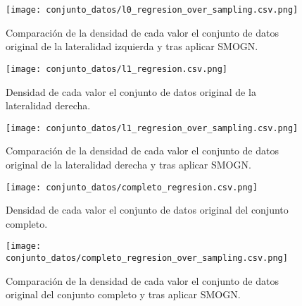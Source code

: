 \begin{figure}[H]
    \centering
     \texttt{[image: conjunto\_datos/l0\_regresion\_over\_sampling.csv.png]}
    \caption{Comparación de la densidad de cada valor el conjunto de datos original de la lateralidad izquierda y tras aplicar SMOGN.}
	 \label{fig:l0-over}
\end{figure}

\begin{figure}[H]
    \centering
	  \texttt{[image: conjunto\_datos/l1\_regresion.csv.png]}
	  \caption{Densidad de cada valor el conjunto de datos original de la lateralidad derecha.}
	 \label{fig:l1-orig}
\end{figure}

\begin{figure}[H]
    \centering
     \texttt{[image: conjunto\_datos/l1\_regresion\_over\_sampling.csv.png]}
	  \caption{Comparación de la densidad de cada valor el conjunto de datos original de la lateralidad derecha y tras aplicar SMOGN.}
	 \label{fig:l1-over}
\end{figure}



\begin{figure}[H]
    \centering
	  \texttt{[image: conjunto\_datos/completo\_regresion.csv.png]}
     \label{fig:completo-orig}
	  \caption{Densidad de cada valor el conjunto de datos original del conjunto completo.}

\end{figure}

\begin{figure}[H]
    \centering
     \texttt{[image: conjunto\_datos/completo\_regresion\_over\_sampling.csv.png]}
	  \caption{Comparación de la densidad de cada valor el conjunto de datos original del conjunto completo y tras aplicar SMOGN.}
	 \label{fig:completo-over}
\end{figure}



\begin{table}[H]
\centering
{}
\caption{Comparación del número de datos en el conjunto original y tras aplicar SMOGN.}\label{table:comparacion_orig_SMOGN}
\end{table}

